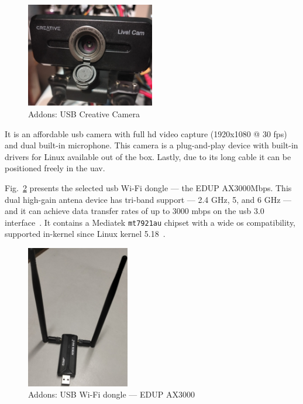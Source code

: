 \begin{figure}[!hbt]
  \centering
  \includegraphics[width=0.5\textwidth]{./img/jpg/creative-cam} 
  \caption{Addons: USB Creative Camera}%
  \label{fig:usb-cam}
\end{figure}

It is an affordable \gls{usb} camera with full
\gls{hd} video capture (1920x1080 @ 30 \gls{fps}) and dual built-in
microphone. This camera is a plug-and-play device with built-in drivers for
Linux available out of the box. Lastly, due to its long cable it can be
positioned freely in the \gls{uav}. 

Fig.~\ref{fig:usb-wifi} presents the selected \gls{usb} Wi-Fi dongle --- the
EDUP AX3000Mbps. This dual high-gain antena device has tri-band support --- 2.4 GHz, 5, and 6
GHz --- and it can achieve data transfer rates
of up to 3000 \gls{mbps} on the \gls{usb} 3.0 interface~\cite{ax3000-specs}. It contains a Mediatek
\texttt{mt7921au} chipset with a wide \gls{os} compatibility, supported
in-kernel since Linux kernel 5.18~\cite{ax3000-linux}.

\begin{figure}[!hbt]
  \centering
  \includegraphics[width=0.4\textwidth]{./img/jpg/ax3000} 
  \caption{Addons: USB Wi-Fi dongle --- EDUP AX3000}%
  \label{fig:usb-wifi}
\end{figure}



